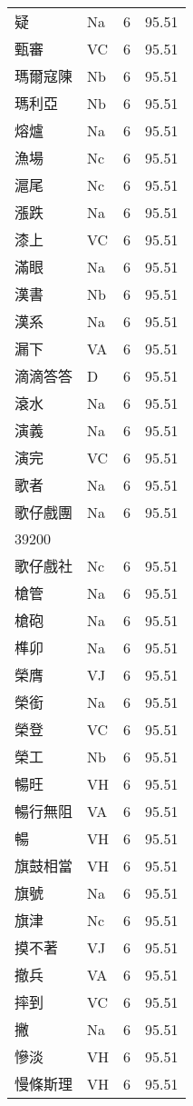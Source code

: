 \documentclass[twocolumn]{book}
\begin{document}
\begin{supertabular}{llrr}
疑 & Na & 6 &  95.51\\
甄審 & VC & 6 &  95.51\\
瑪爾寇陳 & Nb & 6 &  95.51\\
瑪利亞 & Nb & 6 &  95.51\\
熔爐 & Na & 6 &  95.51\\
漁場 & Nc & 6 &  95.51\\
滬尾 & Nc & 6 &  95.51\\
漲跌 & Na & 6 &  95.51\\
漆上 & VC & 6 &  95.51\\
滿眼 & Na & 6 &  95.51\\
漢書 & Nb & 6 &  95.51\\
漢系 & Na & 6 &  95.51\\
漏下 & VA & 6 &  95.51\\
滴滴答答 & D & 6 &  95.51\\
滾水 & Na & 6 &  95.51\\
演義 & Na & 6 &  95.51\\
演完 & VC & 6 &  95.51\\
歌者 & Na & 6 &  95.51\\
歌仔戲團 & Na & 6 &  95.51\\
39200\\
歌仔戲社 & Nc & 6 &  95.51\\
槍管 & Na & 6 &  95.51\\
槍砲 & Na & 6 &  95.51\\
榫卯 & Na & 6 &  95.51\\
榮膺 & VJ & 6 &  95.51\\
榮銜 & Na & 6 &  95.51\\
榮登 & VC & 6 &  95.51\\
榮工 & Nb & 6 &  95.51\\
暢旺 & VH & 6 &  95.51\\
暢行無阻 & VA & 6 &  95.51\\
暢 & VH & 6 &  95.51\\
旗鼓相當 & VH & 6 &  95.51\\
旗號 & Na & 6 &  95.51\\
旗津 & Nc & 6 &  95.51\\
摸不著 & VJ & 6 &  95.51\\
撤兵 & VA & 6 &  95.51\\
摔到 & VC & 6 &  95.51\\
撇 & Na & 6 &  95.51\\
慘淡 & VH & 6 &  95.51\\
慢條斯理 & VH & 6 &  95.51\\

\end{supertabular}
\end{document}
